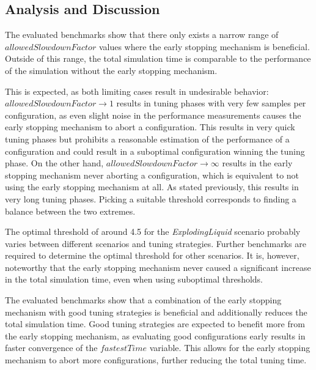\documentclass[conference]{IEEEtran}
\begin{document}
\subsection{Analysis and Discussion}
\begin{description}[leftmargin=1.2em, font=\itshape, style=nextline]
    \item[Optimal Thresholds:]
        The evaluated benchmarks show that there only exists a narrow range of $allowedSlowdownFactor$ values where the early stopping mechanism is beneficial. Outside of this range, the total simulation time is comparable to the performance of the simulation without the early stopping mechanism.

        This is expected, as both limiting cases result in undesirable behavior: $allowedSlowdownFactor \to 1$ results in tuning phases with very few samples per configuration, as even slight noise in the performance measurements causes the early stopping mechanism to abort a configuration. This results in very quick tuning phases but prohibits a reasonable estimation of the performance of a configuration and could result in a suboptimal configuration winning the tuning phase. On the other hand, $allowedSlowdownFactor \to \infty$ results in the early stopping mechanism never aborting a configuration, which is equivalent to not using the early stopping mechanism at all. As stated previously, this results in very long tuning phases. Picking a suitable threshold corresponds to finding a balance between the two extremes.

        The optimal threshold of around 4.5 for the \textit{ExplodingLiquid} scenario probably varies between different scenarios and tuning strategies. Further benchmarks are required to determine the optimal threshold for other scenarios. It is, however, noteworthy that the early stopping mechanism never caused a significant increase in the total simulation time, even when using suboptimal thresholds.

    \item[Combination with Tuning Strategies:]
        The evaluated benchmarks show that a combination of the early stopping mechanism with good tuning strategies is beneficial and additionally reduces the total simulation time. Good tuning strategies are expected to benefit more from the early stopping mechanism, as evaluating good configurations early results in faster convergence of the $fastestTime$ variable. This allows for the early stopping mechanism to abort more configurations, further reducing the total tuning time.


\end{description}
\end{document}
